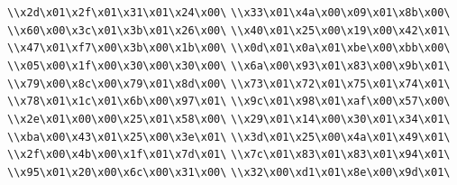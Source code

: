 \verb|\\x2d\x01\x2f\x01\x31\x01\x24\x00\|\newline
\verb|\\x33\x01\x4a\x00\x09\x01\x8b\x00\|\newline
\verb|\\x60\x00\x3c\x01\x3b\x01\x26\x00\|\newline
\verb|\\x40\x01\x25\x00\x19\x00\x42\x01\|\newline
\verb|\\x47\x01\xf7\x00\x3b\x00\x1b\x00\|\newline
\verb|\\x0d\x01\x0a\x01\xbe\x00\xbb\x00\|\newline
\verb|\\x05\x00\x1f\x00\x30\x00\x30\x00\|\newline
\verb|\\x6a\x00\x93\x01\x83\x00\x9b\x01\|\newline
\verb|\\x79\x00\x8c\x00\x79\x01\x8d\x00\|\newline
\verb|\\x73\x01\x72\x01\x75\x01\x74\x01\|\newline
\verb|\\x78\x01\x1c\x01\x6b\x00\x97\x01\|\newline
\verb|\\x9c\x01\x98\x01\xaf\x00\x57\x00\|\newline
\verb|\\x2e\x01\x00\x00\x25\x01\x58\x00\|\newline
\verb|\\x29\x01\x14\x00\x30\x01\x34\x01\|\newline
\verb|\\xba\x00\x43\x01\x25\x00\x3e\x01\|\newline
\verb|\\x3d\x01\x25\x00\x4a\x01\x49\x01\|\newline
\verb|\\x2f\x00\x4b\x00\x1f\x01\x7d\x01\|\newline
\verb|\\x7c\x01\x83\x01\x83\x01\x94\x01\|\newline
\verb|\\x95\x01\x20\x00\x6c\x00\x31\x00\|\newline
\verb|\\x32\x00\xd1\x01\x8e\x00\x9d\x01\|\newline
